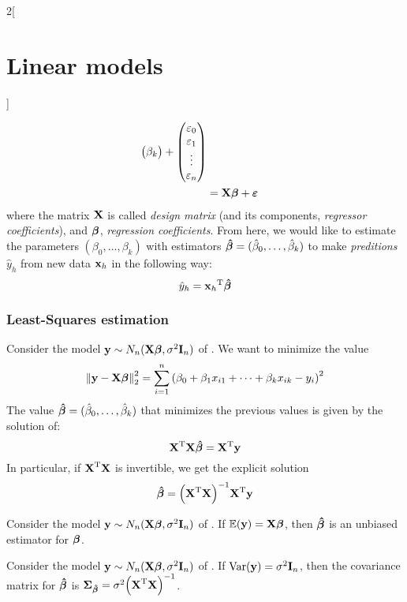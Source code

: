\documentclass[../../../main_math.tex]{subfiles}
\begin{document}
\begin{multicols}{2}[\section{Linear models}]
\begin{definition}
\begin{align}
\begin{pmatrix}
                     \beta_k \\
                   \end{pmatrix}+
      \begin{pmatrix}
        \varepsilon_0 \\
        \varepsilon_1 \\
        \vdots        \\
        \varepsilon_n \\
      \end{pmatrix}                                                \\
      \label{LM:multiple}      & =\boldsymbol{\mathrm{X}}\boldsymbol{\mathrm{\beta}}+\boldsymbol{\mathrm{\varepsilon}}
    \end{align}
    where the matrix $\boldsymbol{\mathrm{X}}$ is called \emph{design matrix} (and its components, \emph{regressor coefficients}), and $\boldsymbol{\mathrm{\beta}}$, \emph{regression coefficients}. From here, we would like to estimate the parameters $(\beta_0,\ldots,\beta_k)$ with estimators $\boldsymbol{\mathrm{\hat\beta}}=(\hat\beta_0,\ldots,\hat\beta_k)$ to make \emph{preditions} $\hat{y}_h$ from new data $\boldsymbol{\mathrm{x}}_h$ in the following way: $$\hat{y}_h={\boldsymbol{\mathrm{x}}_h}^{\mathrm{T}}\boldsymbol{\mathrm{\hat\beta}}$$
  \end{definition}
  \subsubsection{Least-Squares estimation}
  \begin{proposition}
    Consider the model $\boldsymbol{\mathrm{y}}\sim N_n(\boldsymbol{\mathrm{X\beta}},\sigma^2\boldsymbol{\mathrm{I}}_n)$ of . We want to minimize the value $${\left\|\boldsymbol{\mathrm{y}}-\boldsymbol{\mathrm{X\beta}}\right\|}_2^2=\sum_{i=1}^n{\left(\beta_0+\beta_1x_{i1}+\cdots+\beta_kx_{ik}-y_i\right)}^2$$
    The value $\boldsymbol{\mathrm{\hat\beta}}=(\hat\beta_0,\ldots,\hat\beta_k)$ that minimizes the previous values is given by the solution of: $${\boldsymbol{\mathrm{X}}}^{\mathrm{T}}\boldsymbol{\mathrm{X\hat\beta}}={\boldsymbol{\mathrm{X}}}^{\mathrm{T}}\boldsymbol{\mathrm{y}}$$
    In particular, if ${\boldsymbol{\mathrm{X}}}^{\mathrm{T}}\boldsymbol{\mathrm{X}}$ is invertible, we get the explicit solution $$\boldsymbol{\mathrm{\hat\beta}}={\left({\boldsymbol{\mathrm{X}}}^{\mathrm{T}}\boldsymbol{\mathrm{X}}\right)}^{-1}{\boldsymbol{\mathrm{X}}}^{\mathrm{T}}\boldsymbol{\mathrm{y}}$$
  \end{proposition}
  \begin{proposition}
    Consider the model $\boldsymbol{\mathrm{y}}\sim N_n(\boldsymbol{\mathrm{X\beta}},\sigma^2\boldsymbol{\mathrm{I}}_n)$ of . If $\mathbb{E}(\boldsymbol{\mathrm{y}})=\boldsymbol{\mathrm{X\beta}}$, then $\boldsymbol{\mathrm{\hat\beta}}$ is an unbiased estimator for $\boldsymbol{\mathrm{\beta}}$.
  \end{proposition}
  \begin{proposition}
    Consider the model $\boldsymbol{\mathrm{y}}\sim N_n(\boldsymbol{\mathrm{X\beta}},\sigma^2\boldsymbol{\mathrm{I}}_n)$ of . If $\mathrm{Var}(\boldsymbol{\mathrm{y}})=\sigma^2\boldsymbol{\mathrm{I}}_n$, then the covariance matrix for $\boldsymbol{\mathrm{\hat\beta}}$ is $\boldsymbol{\mathrm{\Sigma}}_{\boldsymbol{\mathrm{\hat\beta}}}=\sigma^2{\left({\boldsymbol{\mathrm{X}}}^{\mathrm{T}}\boldsymbol{\mathrm{X}}\right)}^{-1}$.
  \end{proposition}

\end{multicols}
\end{document}
